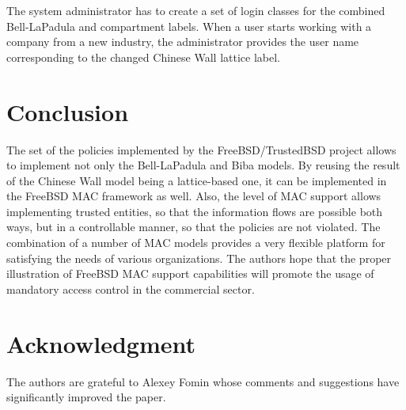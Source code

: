 \documentclass[10pt,a4paper,conference,onecolumn]{IEEEtran}
\begin{document}
The system 
administrator has to create a set of login classes for the combined 
Bell-LaPadula and compartment labels.
When a user starts working with a company from a new industry, the administrator
provides the user name corresponding to the changed Chinese Wall lattice label.

\section{Conclusion}

The set of the policies implemented by the FreeBSD/TrustedBSD project allows
to implement not only the Bell-LaPadula and Biba models. By reusing the 
result of the Chinese Wall model being a lattice-based one, it can be
implemented in the FreeBSD MAC framework as well. Also, the level of MAC 
support allows implementing trusted entities, so that the information
flows are possible both ways, but in a controllable manner, so that the
policies are not violated. The combination of a number of MAC models
provides a very flexible platform for satisfying the needs of
various organizations. The authors hope that the proper illustration of
FreeBSD MAC support capabilities will promote the usage of mandatory
access control in the commercial sector.

\section*{Acknowledgment}

The authors are grateful to Alexey Fomin whose comments and suggestions
have significantly improved the paper.


\end{document}
